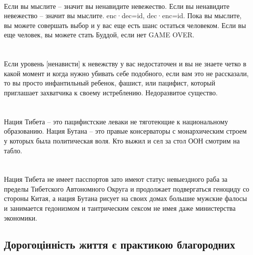 \\
Если вы мыслите -- значит вы ненавидите невежество. Если вы ненавидите невежество -- значит вы мыслите. enc·dec=id, dec·enc=id. Пока вы мыслите, вы можете совершать выбор и у вас еще есть шанс остаться человеком. Если вы еще человек, вы можете стать Буддой, если нет GAME OVER.\\
\\
\\
Если уровень [ненависти] к невежству у вас недостаточен и вы не знаете четко в какой момент и когда нужно убивать себе подобного, если вам это не рассказали, то вы просто инфантильный ребенок, фашист, или пацифист, который приглашает захватчика к своему истреблению. Недоразвитое существо.\\
\\
\\
Нация Тибета -- это пацифистские леваки не тяготеющие к национальному образованию. Нация Бутана -- это правые консерваторы с монархическим строем у которых была политическая воля. Кто выжил и сел за стол ООН смотрим на табло.\\
\\
\\
Нация Тибета не имеет пасспортов зато имеют статус невыездного раба за пределы Тибетского Автономного Округа и продолжает подвергаться геноциду со стороны Китая, а нация Бутана рисует на своих домах большие мужские фалосы и занимается гедонизмом и тантрическим сексом не имея даже министерства экономики.\\

\subsection{Дорогоцінність життя є практикою благородних}

